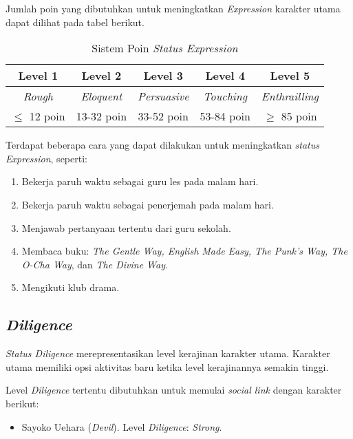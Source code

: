 Jumlah poin yang dibutuhkan untuk meningkatkan \textit{Expression} karakter utama dapat dilihat pada tabel berikut.
\begin{table}[htb]
    \begin{center}
        \begin{tabular}{ | c | c | c | c | c | }
            \hline
            Level 1        & Level 2           & Level 3             & Level 4           & Level 5               \\
            \hline
            \textit{Rough} & \textit{Eloquent} & \textit{Persuasive} & \textit{Touching} & \textit{Enthrailling} \\
            \hline
            $\le$ 12 poin  & 13-32 poin        & 33-52 poin          & 53-84 poin        & $\ge$ 85 poin         \\
            \hline
        \end{tabular}
    \end{center}
    \caption{Sistem Poin \textit{Status Expression}}
\end{table}

Terdapat beberapa cara yang dapat dilakukan untuk meningkatkan \textit{status Expression}, seperti:
\begin{enumerate}
    \item Bekerja paruh waktu sebagai guru les pada malam hari.
    \item Bekerja paruh waktu sebagai penerjemah pada malam hari.
    \item Menjawab pertanyaan tertentu dari guru sekolah.
    \item Membaca buku: \textit{The Gentle Way, English Made Easy, The Punk’s Way, The O-Cha Way}, dan \textit{The Divine Way}.
    \item Mengikuti klub drama.
\end{enumerate}

\subsection{\textit{Diligence}}
\textit{Status Diligence} merepresentasikan level kerajinan karakter utama. Karakter utama memiliki opsi aktivitas baru ketika level kerajinannya semakin tinggi.

Level \textit{Diligence} tertentu dibutuhkan untuk memulai \textit{social link} dengan karakter berikut:
\begin{itemize}
    \item Sayoko Uehara (\textit{Devil}). Level \textit{Diligence}: \textit{Strong}.
\end{itemize}

